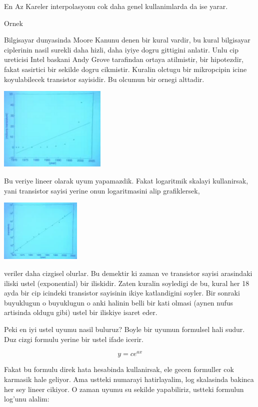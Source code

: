 \documentclass[12pt,fleqn]{article}\usepackage{../common}
\begin{document}
En Az Kareler interpolasyonu cok daha genel kullanimlarda da ise yarar. 

Ornek

Bilgisayar dunyasinda Moore Kanunu denen bir kural vardir, bu kural
bilgisayar ciplerinin nasil surekli daha hizli, daha iyiye dogru gittigini
anlatir. Unlu cip ureticisi Intel baskani Andy Grove tarafindan ortaya
atilmistir, bir hipotezdir, fakat sasirtici bir sekilde dogru
cikmistir. Kuralin olctugu bir mikropcipin icine koyulabilecek transistor
sayisidir. Bu olcumun bir ornegi alttadir. 

\includegraphics[height=4cm]{9_7.png}

Bu veriye lineer olarak uyum yapamazdik. Fakat logaritmik skalayi
kullanirsak, yani transistor sayisi yerine onun logaritmasini alip
grafiklersek, 

\includegraphics[height=3cm]{9_8.png}

veriler daha cizgisel olurlar. Bu demektir ki zaman ve transistor sayisi
arasindaki iliski ustel (exponential) bir iliskidir. Zaten kuralin
soyledigi de bu, kural her 18 ayda bir cip icindeki transistor sayisinin
ikiye katlandigini soyler. Bir sonraki buyuklugun o buyuklugun o anki
halinin belli bir kati olmasi (aynen nufus artisinda oldugu gibi) ustel bir
iliskiye isaret eder. 

Peki en iyi ustel uyumu nasil buluruz? Boyle bir uyumun formulsel hali
sudur. Duz cizgi formulu yerine bir ustel ifade icerir. 

\[ y = ce^{ax} \]

Fakat bu formulu direk hata hesabinda kullanirsak, ele gecen formuller cok
karmasik hale geliyor. Ama ustteki numarayi hatirlayalim, log skalasinda
bakinca her sey lineer cikiyor. O zaman uyumu su sekilde yapabiliriz,
ustteki formulun log'unu alalim:
\end{document}
